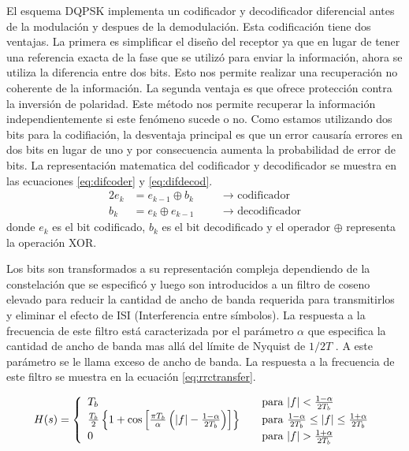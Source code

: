 El esquema DQPSK implementa un codificador y decodificador diferencial antes de la modulaci\'on y
despues de la demodulaci\'on. Esta codificaci\'on tiene dos ventajas. La primera es simplificar el
dise\~no del receptor ya que en lugar de tener una referencia exacta de la fase que se utiliz\'o
para enviar la informaci\'on, ahora se utiliza la diferencia entre dos bits. Esto nos
permite realizar una recuperaci\'on no coherente de la informaci\'on. La segunda ventaja es que
ofrece protecci\'on contra la inversi\'on de polaridad. Este m\'etodo nos permite recuperar la
informaci\'on independientemente si este fen\'omeno sucede o no. Como estamos utilizando dos bits
para la codifiaci\'on, la desventaja principal es que un error causar\'ia errores en dos bits en
lugar de uno y por consecuencia aumenta la probabilidad de error de bits. La representaci\'on
matematica del codificador y decodificador se muestra en las ecuaciones \eqref{eq:difcoder} y
\eqref{eq:difdecod}.
\begin{alignat}{2}
e_k &=e_{k-1}\oplus b_k &\quad &\rightarrow \text{ codificador}\label{eq:difcoder}\\
b_k &=e_k \oplus e_{k-1} &\quad &\rightarrow \text{ decodificador}\label{eq:difdecod}
\end{alignat}
donde $e_k$ es el bit codificado, $b_k$ es el bit decodificado y el operador $\oplus$ representa la
operaci\'on XOR.

Los bits son transformados a su representaci\'on compleja dependiendo de la constelaci\'on que se
especific\'o y luego son introducidos a un filtro de coseno elevado para
reducir la cantidad de ancho de banda requerida para transmitirlos y eliminar el efecto de ISI
(Interferencia entre s\'imbolos). La respuesta a la frecuencia de este filtro est\'a caracterizada
por el par\'ametro $\alpha$ que especifica la cantidad de ancho de banda mas all\'a del l\'imite de
Nyquist de $1/2T$ \cite{sklar}. A este par\'ametro se le llama exceso de ancho de banda. La
respuesta a la frecuencia de este filtro se muestra en la ecuaci\'on \eqref{eq:rrctransfer}.

\begin{equation}\label{eq:rrctransfer}
H(s)=\left\{
\begin{array}{l l}
T_b & \quad \text{para $|f| < \frac{1-\alpha}{2T_b}$}\\
\frac{T_b}{2}\left\{1+\cos{\left[\frac{\pi
T_b}{\alpha}\left(|f|-\frac{1-\alpha}{2T_b}\right)\right]}\right\} & \quad \text{para
$\frac{1-\alpha}{2T_b} \leq |f| \leq \frac{1+\alpha}{2T_b}$}\\ 0 & \quad \text{para $|f| >
\frac{1+\alpha}{2T_b}$} \end{array}\right.
\end{equation}

